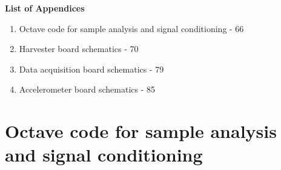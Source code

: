 \documentclass[12pt,a4paper]{article}
\begin{document}
\FloatBarrier
\clearpage

\printbibliography

% 
%

\clearpage

\begin{appendices}

\textbf{List of Appendices}

\begin{enumerate}[label=\textbf{\Alph*.}]
\item Octave code for sample analysis and signal conditioning - 66
\item Harvester board schematics - 70
\item Data acquisition board schematics - 79
\item Accelerometer board schematics - 85
\end{enumerate}

\section{Octave code for sample analysis and signal conditioning}





%



%



%

\end{appendices}
\end{document}
